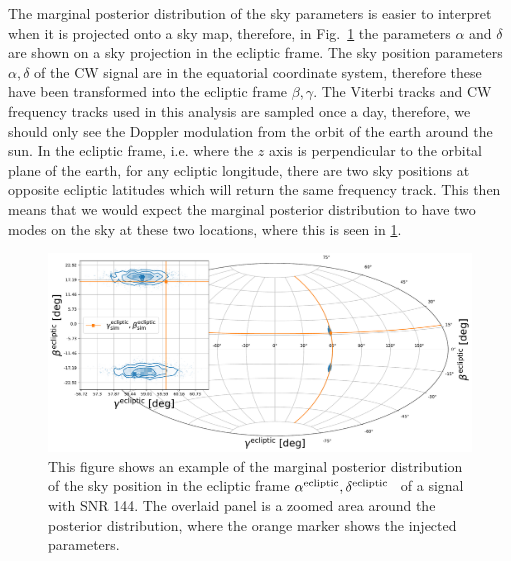 The marginal posterior distribution of the sky parameters is easier to
interpret when it is projected onto a sky map, therefore,
in Fig.~\ref{par_est:results:example_skypos} the parameters $\alpha$ and $\delta$
are shown on a sky projection in the ecliptic frame. The sky
position parameters $\alpha,\delta$ of the \gls{CW} signal are in the
equatorial coordinate system, therefore these have been transformed into the
ecliptic frame $\beta,\gamma$. The Viterbi tracks and \gls{CW} frequency tracks used in this
analysis are sampled once a day, therefore, we should only see the Doppler
modulation from the orbit of the earth around the sun.  In the ecliptic frame,
i.e. where the $z$ axis is perpendicular to the orbital plane of the earth, for
any ecliptic longitude, there are two sky positions at opposite ecliptic
latitudes which will return the same frequency track.  This then means that we
would expect the marginal posterior distribution to have two modes on the sky
at these two locations, where this is seen in
\ref{par_est:results:example_skypos}.
%
\begin{figure}[ht]
    \centering
    \includegraphics[width=\linewidth]{C5_parameter/skypos_ecliptic.pdf}
    \caption[Example of posterior of sky position in ecliptic frame]{This
figure shows an example of the marginal posterior distribution of the sky
position in the ecliptic frame
$\alpha^{\rm{ecliptic}},\delta^{\rm{ecliptic}}$~ of a signal with \gls{SNR} 144. The
overlaid panel is a zoomed area around the posterior distribution, where the
orange marker shows the injected parameters.~} \label{par_est:results:example_skypos}   
\end{figure}
%

%
%
